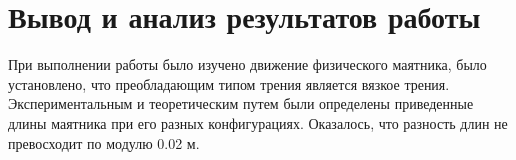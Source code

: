 \clearpage
\section{Вывод и анализ результатов работы}
При выполнении работы было изучено движение физического маятника,
было установлено, что преобладающим типом трения является вязкое трения.
Экспериментальным и теоретическим путем были определены приведенные
длины маятника при его разных конфигурациях.
Оказалось, что разность длин не превосходит по модулю 0.02 м.
